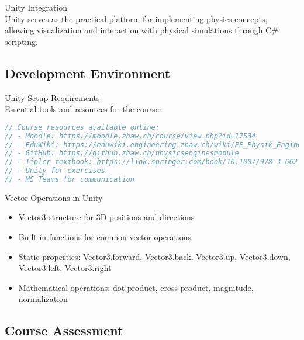 \begin{concept}{Unity Integration}\\
    Unity serves as the practical platform for implementing physics concepts, allowing visualization and interaction with physical simulations through C\# scripting.
\end{concept}

\subsection{Development Environment}

\begin{code}{Unity Setup Requirements}\\
    Essential tools and resources for the course:
\begin{lstlisting}[language=C, style=basesmol]
// Course resources available online:
// - Moodle: https://moodle.zhaw.ch/course/view.php?id=17534
// - EduWiki: https://eduwiki.engineering.zhaw.ch/wiki/PE_Physik_Engines
// - GitHub: https://github.zhaw.ch/physicsenginesmodule
// - Tipler textbook: https://link.springer.com/book/10.1007/978-3-662-58281-7
// - Unity for exercises
// - MS Teams for communication
\end{lstlisting}
\end{code}

\begin{definition}{Vector Operations in Unity}
    \begin{itemize}
        \item Vector3 structure for 3D positions and directions
        \item Built-in functions for common vector operations
        \item Static properties: Vector3.forward, Vector3.back, Vector3.up, Vector3.down, Vector3.left, Vector3.right
        \item Mathematical operations: dot product, cross product, magnitude, normalization
    \end{itemize}
\end{definition}

\subsection{Course Assessment}

